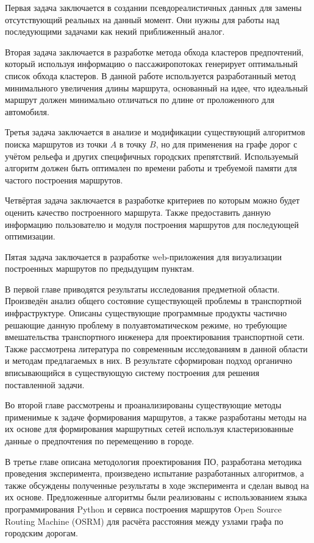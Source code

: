 Первая задача заключается в создании псевдореалистичных данных для замены отсутствующий реальных на данный 
момент. Они нужны для работы над последующими задачами как некий приближенный аналог.

Вторая задача заключается в разработке метода обхода кластеров предпочтений, который используя информацию о 
пассажиропотоках генерирует оптимальный список обхода кластеров. В данной работе используется разработанный 
метод минимального увеличения длины маршрута, основанный на идее, что идеальный маршрут должен минимально 
отличаться по длине от проложенного для автомобиля.

Третья задача заключается в анализе и модификации существующий алгоритмов поиска маршрутов из точки \( A \) 
в точку \( B \), но для применения на графе дорог с учётом рельефа и других специфичных городских 
препятствий. Используемый алгоритм должен быть оптимален по времени работы и требуемой памяти для частого 
построения маршрутов.

Четвёртая задача заключается в разработке критериев по которым можно будет оценить качество построенного 
маршрута. Также предоставить данную информацию пользователю и модуля построения маршрутов для последующей 
оптимизации.

Пятая задача заключается в разработке web-приложения для визуализации построенных маршрутов по предыдущим 
пунктам.

В первой главе приводятся результаты исследования предметной области. Произведён анализ общего состояние 
существующей проблемы в транспортной инфраструктуре. Описаны существующие программные продукты частично 
решающие данную проблему в полуавтоматическом режиме, но требующие вмешательства транспортного инженера для 
проектирования транспортной сети. Также рассмотрена литература по современным исследованиям в данной области 
и методам предлагаемых в них. В результате сформирован подход органично вписывающийся в существующую систему 
построения для решения поставленной задачи.

Во второй главе рассмотрены и проанализированы существующие методы применимые к задаче формирования 
маршрутов, а также разработаны методы на их основе для формирования маршрутных сетей используя 
кластеризованные данные о предпочтения по перемещению в городе.

В третье главе описана методология проектирования ПО, разработана методика проведения эксперимента, 
произведено испытание разработанных алгоритмов, а также обсуждены полученные результаты в ходе эксперимента и 
сделан вывод на их основе. Предложенные алгоритмы были реализованы с использованием языка программирования 
Python и сервиса построения маршрутов Open Source Routing Machine (OSRM) для расчёта расстояния между узлами 
графа по городским дорогам.

